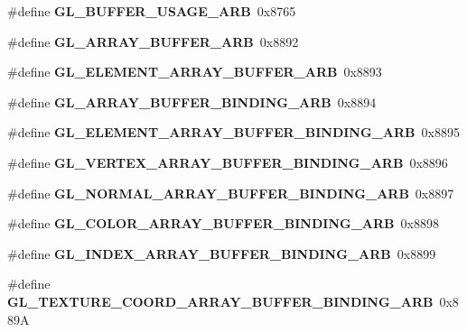 \begin{DoxyCompactItemize}
\item 
\#define {\bfseries G\+L\+\_\+\+B\+U\+F\+F\+E\+R\+\_\+\+U\+S\+A\+G\+E\+\_\+\+A\+R\+B}~0x8765\label{_s_d_l__opengl_8h_af76ad34f6b2ded96a99fa8fce2731a43}

\item 
\#define {\bfseries G\+L\+\_\+\+A\+R\+R\+A\+Y\+\_\+\+B\+U\+F\+F\+E\+R\+\_\+\+A\+R\+B}~0x8892\label{_s_d_l__opengl_8h_acb1c5ea3239de87d09959457ffa42f6f}

\item 
\#define {\bfseries G\+L\+\_\+\+E\+L\+E\+M\+E\+N\+T\+\_\+\+A\+R\+R\+A\+Y\+\_\+\+B\+U\+F\+F\+E\+R\+\_\+\+A\+R\+B}~0x8893\label{_s_d_l__opengl_8h_ae01505dfe71e32eddbd73c3c0ce713ba}

\item 
\#define {\bfseries G\+L\+\_\+\+A\+R\+R\+A\+Y\+\_\+\+B\+U\+F\+F\+E\+R\+\_\+\+B\+I\+N\+D\+I\+N\+G\+\_\+\+A\+R\+B}~0x8894\label{_s_d_l__opengl_8h_aa31e7d2730e196f2f41933e1b70ae121}

\item 
\#define {\bfseries G\+L\+\_\+\+E\+L\+E\+M\+E\+N\+T\+\_\+\+A\+R\+R\+A\+Y\+\_\+\+B\+U\+F\+F\+E\+R\+\_\+\+B\+I\+N\+D\+I\+N\+G\+\_\+\+A\+R\+B}~0x8895\label{_s_d_l__opengl_8h_a37d58cc04db7ee70ec314e007b4d9f5a}

\item 
\#define {\bfseries G\+L\+\_\+\+V\+E\+R\+T\+E\+X\+\_\+\+A\+R\+R\+A\+Y\+\_\+\+B\+U\+F\+F\+E\+R\+\_\+\+B\+I\+N\+D\+I\+N\+G\+\_\+\+A\+R\+B}~0x8896\label{_s_d_l__opengl_8h_ac8f950c64ca4a7a0bf04019c4f1c9980}

\item 
\#define {\bfseries G\+L\+\_\+\+N\+O\+R\+M\+A\+L\+\_\+\+A\+R\+R\+A\+Y\+\_\+\+B\+U\+F\+F\+E\+R\+\_\+\+B\+I\+N\+D\+I\+N\+G\+\_\+\+A\+R\+B}~0x8897\label{_s_d_l__opengl_8h_a62044a50ad83ae9df0b7a6bfc6f59909}

\item 
\#define {\bfseries G\+L\+\_\+\+C\+O\+L\+O\+R\+\_\+\+A\+R\+R\+A\+Y\+\_\+\+B\+U\+F\+F\+E\+R\+\_\+\+B\+I\+N\+D\+I\+N\+G\+\_\+\+A\+R\+B}~0x8898\label{_s_d_l__opengl_8h_ac582a701af66e598087965f9531bc30e}

\item 
\#define {\bfseries G\+L\+\_\+\+I\+N\+D\+E\+X\+\_\+\+A\+R\+R\+A\+Y\+\_\+\+B\+U\+F\+F\+E\+R\+\_\+\+B\+I\+N\+D\+I\+N\+G\+\_\+\+A\+R\+B}~0x8899\label{_s_d_l__opengl_8h_a46a562817d0b8da437857f523ce8ae3d}

\item 
\#define {\bfseries G\+L\+\_\+\+T\+E\+X\+T\+U\+R\+E\+\_\+\+C\+O\+O\+R\+D\+\_\+\+A\+R\+R\+A\+Y\+\_\+\+B\+U\+F\+F\+E\+R\+\_\+\+B\+I\+N\+D\+I\+N\+G\+\_\+\+A\+R\+B}~0x889\+A\label{_s_d_l__opengl_8h_a0280aa997eea1c697aae3e1d1e8aa8be}


\end{DoxyCompactItemize}
